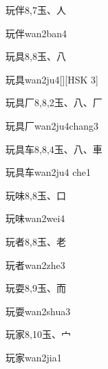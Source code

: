 \begin{Entry}{玩伴}{8,7}{⽟、⼈}
  \begin{Phonetics}{玩伴}{wan2ban4}
  \end{Phonetics}
\end{Entry}

\begin{Entry}{玩具}{8,8}{⽟、⼋}
  \begin{Phonetics}{玩具}{wan2ju4}[][HSK 3]
  \end{Phonetics}
\end{Entry}

\begin{Entry}{玩具厂}{8,8,2}{⽟、⼋、⼚}
  \begin{Phonetics}{玩具厂}{wan2ju4chang3}
  \end{Phonetics}
\end{Entry}

\begin{Entry}{玩具车}{8,8,4}{⽟、⼋、⾞}
  \begin{Phonetics}{玩具车}{wan2ju4 che1}
  \end{Phonetics}
\end{Entry}

\begin{Entry}{玩味}{8,8}{⽟、⼝}
  \begin{Phonetics}{玩味}{wan2wei4}
  \end{Phonetics}
\end{Entry}

\begin{Entry}{玩者}{8,8}{⽟、⽼}
  \begin{Phonetics}{玩者}{wan2zhe3}
  \end{Phonetics}
\end{Entry}

\begin{Entry}{玩耍}{8,9}{⽟、⽽}
  \begin{Phonetics}{玩耍}{wan2shua3}
  \end{Phonetics}
\end{Entry}

\begin{Entry}{玩家}{8,10}{⽟、⼧}
  \begin{Phonetics}{玩家}{wan2jia1}
  \end{Phonetics}
\end{Entry}

